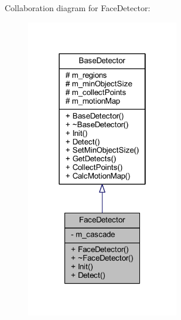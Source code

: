 Collaboration diagram for Face\+Detector\+:\nopagebreak
\begin{figure}[H]
\begin{center}
\leavevmode
\includegraphics[width=190pt]{class_face_detector__coll__graph}
\end{center}
\end{figure}
